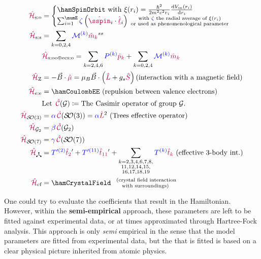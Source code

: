 \documentclass[11pt, twoside,openright]{article}
\begin{document}
\begin{mdframed}
\begin{align}
	\hamSpinOrbitSymbol &= \begin{cases} 
			\hamSpinOrbit \text{ with } \xi{(r_i)} = \frac{\hbar^2}{2 m^2 c^2 r_i} \frac{\diff{V_\text{sn}(r_i)}}{\diff{r_i}} \\
			\sum_{i=1}^\numE \spinZeta \paren{\op{\sspin}_i \cdot \op{\lorb}_i} {{\substack{
						\text{ with $\spinZeta$ the radial average of $\xi(r_i)$} \\ 
						\text{ or used as phenomenological parameter}  
						}
					}}    
			\end{cases} \\    
	\hamSpinSpinSymbol &= \hamSpinSpin \\  
	& \hamSOOplusECSOSymbol = \hamSOOplusECSO \\
    \hamZeemanSymbol &= -\vec{B} \cdot \op{\mu} = \hamZeeman \text{(interaction with a magnetic field)} \\
	\ham_\text{e:e} &= \hamCoulombEE \text{ (repulsion between valence electrons)} \\  
	\nonumber & \text{Let } \casimir{\anyGroup} \DEF \text{The Casimir operator of group $\anyGroup$.}\\ 
	\hamTreesSymbol &= \casimirAlpha\casimir{\SO{3}} = \casimirAlpha \op{L}^2 \text{ (Trees effective operator)} \\
	\hamGTwoSymbol      &= \casimirBeta\casimir{\Gtwo} \\
	\hamSOSevenSymbol   &= \casimirGamma\casimir{\SO{7}} \\
	\ham_{\trispoke} &= {\paramcolor{T'^{(2)}}} \tk{2}' + {\paramcolor{T'^{(11)}}} \tk{11}' + \hamEffectiveThreeBody \text{ (effective 3-body int.)} \\
	\hamCrystalFieldSymbol &= \hamCrystalField \,\,\, {   
		\substack{
			\text{ (crystal field interaction} \\
			\text{with surroundings)}
			} 
			}
\end{align}  
\end{mdframed}

One could try to evaluate the coefficients that result in the Hamiltonian. However, within the  \textbf{semi-empirical} approach, these parameters are left to be fitted against experimental data, or at times approximated through Hartree-Fock analysis. This approach is only \textit{semi} empirical in the sense that the model parameters are fitted from experimental data, but the \hamilton that is fitted is based on a clear physical picture inherited from atomic physics.
\end{document}
